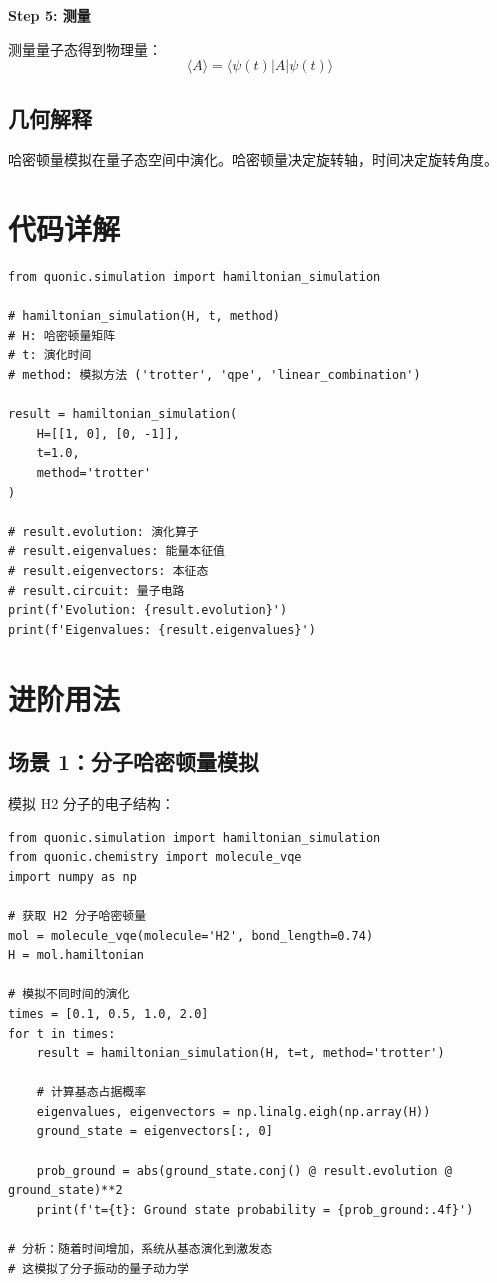 \documentclass[12pt,a4paper]{article}
\begin{document}
\textbf{Step 5: 测量}

测量量子态得到物理量：
\begin{equation}
\langle A \rangle = \langle\psi(t)|A|\psi(t)\rangle
\end{equation}

\subsection{几何解释}

哈密顿量模拟在量子态空间中演化。哈密顿量决定旋转轴，时间决定旋转角度。

\section{代码详解}

\begin{verbatim}
from quonic.simulation import hamiltonian_simulation

# hamiltonian_simulation(H, t, method)
# H: 哈密顿量矩阵
# t: 演化时间
# method: 模拟方法 ('trotter', 'qpe', 'linear_combination')

result = hamiltonian_simulation(
    H=[[1, 0], [0, -1]],
    t=1.0,
    method='trotter'
)

# result.evolution: 演化算子
# result.eigenvalues: 能量本征值
# result.eigenvectors: 本征态
# result.circuit: 量子电路
print(f'Evolution: {result.evolution}')
print(f'Eigenvalues: {result.eigenvalues}')
\end{verbatim}

\section{进阶用法}

\subsection{场景 1：分子哈密顿量模拟}

模拟 H2 分子的电子结构：

\begin{verbatim}
from quonic.simulation import hamiltonian_simulation
from quonic.chemistry import molecule_vqe
import numpy as np

# 获取 H2 分子哈密顿量
mol = molecule_vqe(molecule='H2', bond_length=0.74)
H = mol.hamiltonian

# 模拟不同时间的演化
times = [0.1, 0.5, 1.0, 2.0]
for t in times:
    result = hamiltonian_simulation(H, t=t, method='trotter')

    # 计算基态占据概率
    eigenvalues, eigenvectors = np.linalg.eigh(np.array(H))
    ground_state = eigenvectors[:, 0]

    prob_ground = abs(ground_state.conj() @ result.evolution @ ground_state)**2
    print(f't={t}: Ground state probability = {prob_ground:.4f}')

# 分析：随着时间增加，系统从基态演化到激发态
# 这模拟了分子振动的量子动力学
\end{verbatim}
\end{document}
